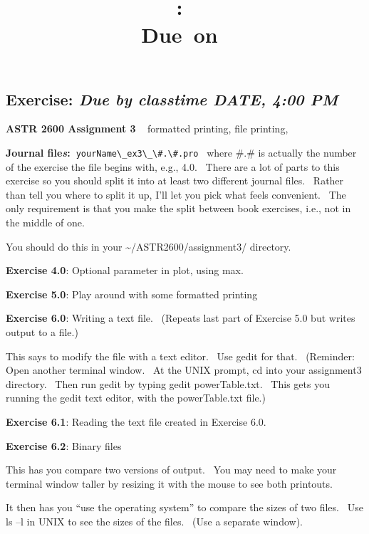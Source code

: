 \documentclass{article}
\title{\vspace{2in}\textmd{\textbf{\hmwkClass:\ \hmwkTitle}}\\\normalsize\vspace{0.1in}\small{Due\ on\ \hmwkDueDate}\\\vspace{0.1in}\large{}\vspace{3in}}
\date{}
\newcommand{\hmwkDueDate}{DATE, 4:00 PM}
\begin{document}
\begin{spacing}{1.0}
\newpage



\section{\textbf{Exercise:} \emph{  Due by classtime \hmwkDueDate}}


\textbf{ASTR 2600 Assignment 3} ~ formatted printing, file printing,



\textbf{Journal file\emph{s}:~}\verb|yourName\_ex3\_\#.\#.pro|~ where \#.\# is
actually the number of the exercise the file begins with, e.g., 4.0.~
There are a lot of parts to this exercise so you should split it into at
least two different journal files.~ Rather than tell you where to split
it up, I'll let you pick what feels convenient.~ The only requirement is
that you make the split between book exercises, i.e., not in the middle
of one.

You should do this in your \textasciitilde{}/ASTR2600/assignment3/
directory.


\textbf{Exercise 4.0}: Optional parameter in plot, using max.

\textbf{Exercise 5.0}: Play around with some formatted printing

\textbf{Exercise 6.0}: Writing a text file.~ (Repeats last part of
Exercise 5.0 but writes output to a file.)~

This says to modify the file with a text editor.~ Use gedit for that.~
(Reminder: Open another terminal window.~ At the UNIX prompt, cd into
your assignment3 directory.~ Then run gedit by typing gedit
powerTable.txt.~ This gets you running the gedit text editor, with the
powerTable.txt file.)

\textbf{Exercise 6.1}: Reading the text file created in Exercise 6.0.

\textbf{Exercise 6.2}: Binary files

This has you compare two versions of output.~ You may need to make your
terminal window taller by resizing it with the mouse to see both
printouts.

It then has you ``use the operating system'' to compare the sizes of two
files.~ Use ls --l in UNIX to see the sizes of the files.~ (Use a
separate window).


\end{spacing}
\end{document}
